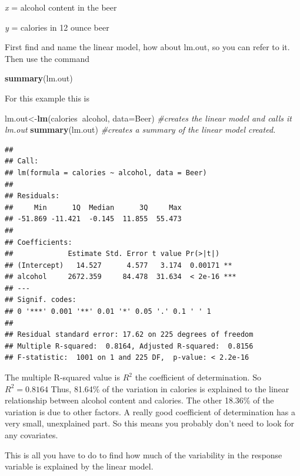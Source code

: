 \documentclass[
]{book}
\newenvironment{Shaded}{\begin{snugshade}}{\end{snugshade}}
\newcommand{\CommentTok}[1]{\textcolor[rgb]{0.56,0.35,0.01}{\textit{#1}}}
\newcommand{\DataTypeTok}[1]{\textcolor[rgb]{0.13,0.29,0.53}{#1}}
\newcommand{\KeywordTok}[1]{\textcolor[rgb]{0.13,0.29,0.53}{\textbf{#1}}}
\newcommand{\NormalTok}[1]{#1}
\newcommand{\OperatorTok}[1]{\textcolor[rgb]{0.81,0.36,0.00}{\textbf{#1}}}
\begin{document}
\emph{x} = alcohol content in the beer

\emph{y} = calories in 12 ounce beer

First find and name the linear model, how about lm.out, so you can refer to it. Then use the command

\begin{Shaded}
\begin{Highlighting}[]
\KeywordTok{summary}\NormalTok{(lm.out)}
\end{Highlighting}
\end{Shaded}

For this example this is

\begin{Shaded}
\begin{Highlighting}[]
\NormalTok{lm.out<-}\KeywordTok{lm}\NormalTok{(calories}\OperatorTok{~}\NormalTok{alcohol, }\DataTypeTok{data=}\NormalTok{Beer) }\CommentTok{#creates the linear model and calls it lm.out}
\KeywordTok{summary}\NormalTok{(lm.out) }\CommentTok{#creates a summary of the linear model created.}
\end{Highlighting}
\end{Shaded}

\begin{verbatim}
## 
## Call:
## lm(formula = calories ~ alcohol, data = Beer)
## 
## Residuals:
##     Min      1Q  Median      3Q     Max 
## -51.869 -11.421  -0.145  11.855  55.473 
## 
## Coefficients:
##             Estimate Std. Error t value Pr(>|t|)    
## (Intercept)   14.527      4.577   3.174  0.00171 ** 
## alcohol     2672.359     84.478  31.634  < 2e-16 ***
## ---
## Signif. codes:  
## 0 '***' 0.001 '**' 0.01 '*' 0.05 '.' 0.1 ' ' 1
## 
## Residual standard error: 17.62 on 225 degrees of freedom
## Multiple R-squared:  0.8164, Adjusted R-squared:  0.8156 
## F-statistic:  1001 on 1 and 225 DF,  p-value: < 2.2e-16
\end{verbatim}

The multiple R-squared value is \(R^2\) the coefficient of determination. So \(R^2=0.8164\)
Thus, 81.64\% of the variation in calories is explained to the linear relationship between alcohol content and calories. The other 18.36\% of the variation is due to other factors. A really good coefficient of determination has a very small, unexplained part. So this means you probably don't need to look for any covariates.

This is all you have to do to find how much of the variability in the response variable is explained by the linear model.
\end{document}
